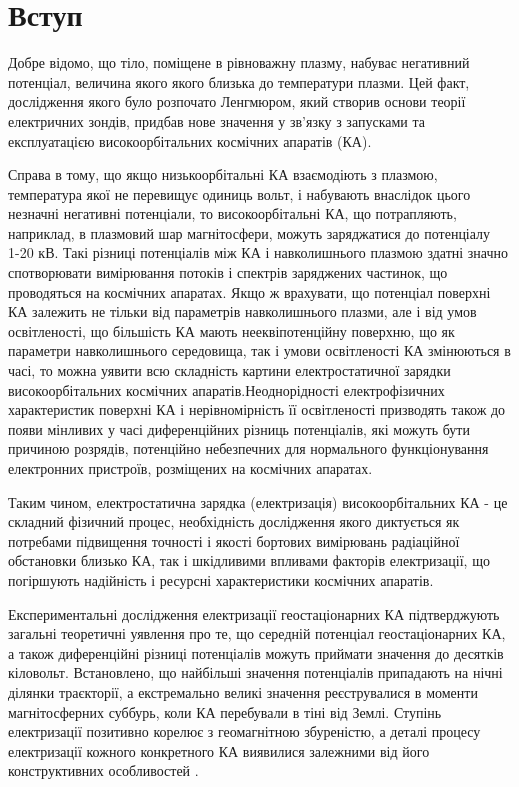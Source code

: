\documentclass[a4paper,12pt]{article}
\begin{document}
\tableofcontents

\newpage

\onehalfspacing
\large

\section*{Вступ}
Добре відомо, що тіло, поміщене в рівноважну плазму, набуває негативний потенціал, величина якого якого близька до температури плазми. Цей факт, дослідження якого було розпочато Ленгмюром, який створив основи теорії електричних зондів, придбав нове значення у зв'язку з запусками та експлуатацією високоорбітальних космічних апаратів (КА).

Справа в тому, що якщо низькоорбітальні КА взаємодіють з плазмою, температура якої не перевищує одиниць вольт, і набувають внаслідок цього незначні негативні потенціали, то високоорбітальні КА, що потрапляють, наприклад, в плазмовий шар магнітосфери, можуть заряджатися до потенціалу ~ 1-20 кВ. Такі різниці потенціалів між КА і навколишнього плазмою здатні значно спотворювати вимірювання потоків і спектрів заряджених частинок, що проводяться на космічних апаратах. Якщо ж врахувати, що потенціал поверхні КА залежить не тільки від параметрів навколишнього плазми, але і від умов освітленості, що більшість КА мають нееквіпотенційну поверхню, що як параметри навколишнього середовища, так і умови освітленості КА змінюються в часі, то можна уявити всю складність картини електростатичної зарядки високоорбітальних космічних апаратів.Неоднорідності електрофізичних характеристик поверхні КА і нерівномірність її освітленості призводять також до появи мінливих у часі диференційних різниць потенціалів, які можуть бути причиною розрядів, потенційно небезпечних для нормального функціонування електронних пристроїв, розміщених на космічних апаратах.

Таким чином, електростатична зарядка (електризація) високоорбітальних КА - це складний фізичний процес, необхідність дослідження якого диктується як потребами підвищення точності і якості бортових вимірювань радіаційної обстановки близько КА, так і шкідливими впливами факторів електризації, що погіршують надійність і ресурсні характеристики космічних апаратів.

Експериментальні дослідження електризації геостаціонарних КА підтверджують загальні теоретичні уявлення про те, що середній потенціал геостаціонарних КА, а також диференційні різниці потенціалів можуть приймати значення до десятків кіловольт. Встановлено, що найбільші значення потенціалів припадають на нічні ділянки траєкторії, а екстремально великі значення реєструвалися в моменти магнітосферних суббурь, коли КА перебували в тіні від Землі. Ступінь електризації позитивно корелює з геомагнітною збуреністю, а деталі процесу електризації кожного конкретного КА виявилися залежними від його конструктивних особливостей \cite{vakulin}.
\end{document}
